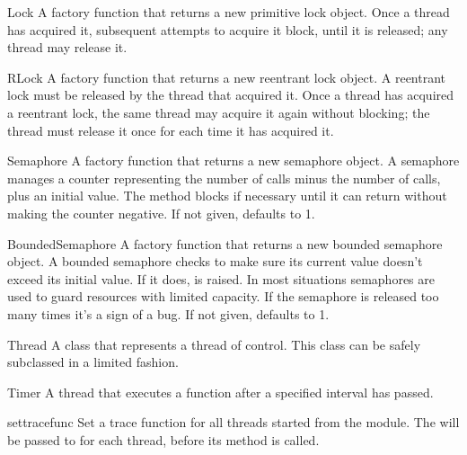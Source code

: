 \begin{funcdesc}{Lock}{}
A factory function that returns a new primitive lock object.  Once
a thread has acquired it, subsequent attempts to acquire it block,
until it is released; any thread may release it.
\end{funcdesc}

\begin{funcdesc}{RLock}{}
A factory function that returns a new reentrant lock object.
A reentrant lock must be released by the thread that acquired it.
Once a thread has acquired a reentrant lock, the same thread may
acquire it again without blocking; the thread must release it once
for each time it has acquired it.
\end{funcdesc}

\begin{funcdesc}{Semaphore}{}
A factory function that returns a new semaphore object.  A
semaphore manages a counter representing the number of 
calls minus the number of  calls, plus an initial value.
The  method blocks if necessary until it can return
without making the counter negative.  If not given,  defaults to
1. 
\end{funcdesc}

\begin{funcdesc}{BoundedSemaphore}{}
A factory function that returns a new bounded semaphore object.  A bounded
semaphore checks to make sure its current value doesn't exceed its initial
value.  If it does,  is raised. In most situations
semaphores are used to guard resources with limited capacity.  If the
semaphore is released too many times it's a sign of a bug.  If not given,
 defaults to 1. 
\end{funcdesc}

\begin{classdesc*}{Thread}{}
A class that represents a thread of control.  This class can be safely
subclassed in a limited fashion.
\end{classdesc*}

\begin{classdesc*}{Timer}{}
A thread that executes a function after a specified interval has passed.
\end{classdesc*}

\begin{funcdesc}{settrace}{func}
Set a trace function  for all threads started
from the  module.  The  will be passed to 
 for each thread, before its 
method is called.
\end{funcdesc}


